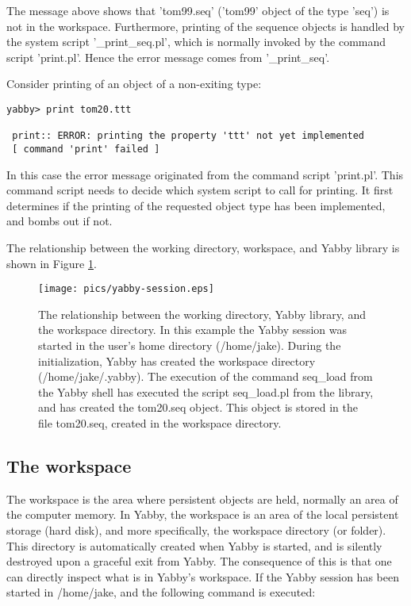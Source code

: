 The message above shows that 'tom99.seq' ('tom99' object of the 
type 'seq') is not in the workspace. Furthermore, printing of the
sequence objects is handled by the system script '\_print\_seq.pl',
which is normally invoked by the command script 'print.pl'. Hence
the error message comes from '\_print\_seq'.

Consider printing of an object of a non-exiting type:

\begin{verbatim}
yabby> print tom20.ttt

 print:: ERROR: printing the property 'ttt' not yet implemented
 [ command 'print' failed ]
\end{verbatim}

In this case the error message originated from the command script
'print.pl'. This command script needs to decide which system script
to call for printing. It first determines if the printing of the
requested object type has been implemented, and bombs out if not.

The relationship between the working directory, workspace, and Yabby
library is shown in Figure \ref{fig:session}.

\begin{figure}
\centering
\texttt{[image: pics/yabby-session.eps]}
\caption{The relationship between the working directory, Yabby
library, and the workspace directory. In this example the Yabby
session was started in the user's home directory (/home/jake).
During the initialization, Yabby has created the workspace directory
(/home/jake/.yabby). The execution of the command seq\_load from
the Yabby shell has executed the script seq\_load.pl from the
library, and has created the tom20.seq object. This object is
stored in the file tom20.seq, created in the workspace directory.}
\label{fig:session}
\end{figure}

\subsection{The workspace}

The workspace is the area where persistent objects are held,
normally an area of the computer memory. In Yabby, the workspace
is an area of the local persistent storage (hard disk), and more
specifically, the workspace directory (or folder). This directory
is automatically created when Yabby is started, and is silently
destroyed upon a graceful exit from Yabby. The consequence of
this is that one can directly inspect what is in Yabby's workspace. 
If the Yabby session has been started in /home/jake, and the
following command is executed:


